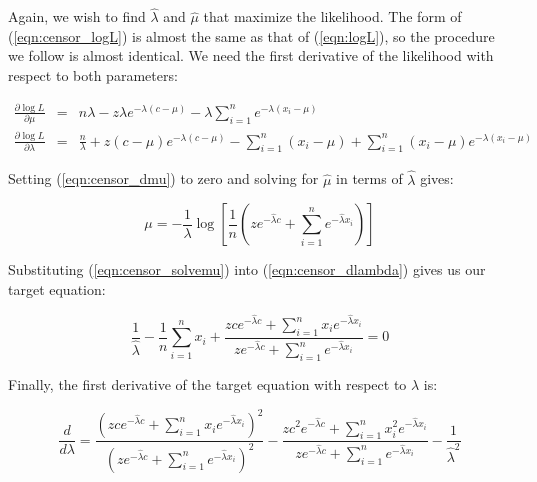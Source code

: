 Again, we wish to find $\hat{\lambda}$ and $\hat{\mu}$ that maximize
the likelihood. The form of (\ref{eqn:censor_logL}) is almost the same
as that of (\ref{eqn:logL}), so the procedure we follow is almost
identical. We need the first derivative of the likelihood with respect
to both parameters:

\begin{eqnarray}
\frac{\partial \log L}{\partial \mu} & = &
n \lambda  
- z \lambda e^{-\lambda (c - \mu)}
- \lambda \sum_{i=1}^{n} e^{-\lambda (x_i - \mu)}
\label{eqn:censor_dmu}
\\%
\frac{\partial \log L}{\partial \lambda} & = &
\frac{n}{\lambda} 
+ z (c - \mu) e^{-\lambda (c - \mu)}
- \sum_{i=1}^{n} (x_i - \mu) 
+ \sum_{i=1}^{n} (x_i - \mu) e^{-\lambda (x_i - \mu)}
\label{eqn:censor_dlambda}
\end{eqnarray}

Setting (\ref{eqn:censor_dmu}) to zero and solving for $\hat{\mu}$ in
terms of $\hat{\lambda}$ gives:

\begin{equation}
\mu  =  - \frac{1}{\lambda} 
	\log \left[ \frac{1}{n} 
	\left( z e^{-\hat{\lambda} c} 
               + \sum_{i=1}^{n} e^{-\hat{\lambda} x_i} \right)
	\right]
\label{eqn:censor_solvemu}
\end{equation}

Substituting (\ref{eqn:censor_solvemu}) into
(\ref{eqn:censor_dlambda}) gives us our target equation:

\begin{equation}
\frac{1}{\hat{\lambda}} 
- \frac{1}{n} \sum_{i=1}^{n} x_i +
\frac{z c e^{-\hat{\lambda} c} + \sum_{i=1}^{n} x_i e^{-\hat{\lambda} x_i}} 
     {z e^{-\hat{\lambda} c} + \sum_{i=1}^{n} e^{-\hat{\lambda} x_i}} 
 =  0
\label{eqn:censor_newtontarget}
\end{equation}

Finally, the first derivative of the target equation with respect to
$\lambda$ is:

\begin{equation}
\frac{d}{d\lambda} = 
\frac{\left( 
        z c e^{-\hat{\lambda} c}
        + \sum_{i=1}^{n} x_i e^{-\hat{\lambda} x_i} 
       \right)^2 } 
     {\left( 
        z e^{-\hat{\lambda} c}
        + \sum_{i=1}^{n} e^{-\hat{\lambda} x_i}     
       \right)^2 }
-
\frac{z c^2 e^{-\hat{\lambda} c} + \sum_{i=1}^{n} x_i^2 e^{-\hat{\lambda} x_i}}
     {z  e^{-\hat{\lambda} c} + \sum_{i=1}^{n} e^{-\hat{\lambda} x_i}}
-
\frac{1}{\hat{\lambda}^2}
\label{eqn:censor_newtonderiv}
\end{equation}

